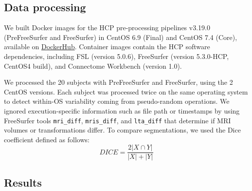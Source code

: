 \documentclass[a4paper,num-refs]{oup-contemporary}
\begin{document}

\subsection{Data processing}

We built Docker images for the HCP pre-processing pipelines v3.19.0
(PreFreeSurfer and FreeSurfer) in CentOS 6.9 (Final) and CentOS 7.4 (Core), available on
\href{https://hub.docker.com/r/bigdatalabteam/hcp-prefreesurfer/}{DockerHub}.
Container images contain the HCP software dependencies, including FSL
(version 5.0.6), FreeSurfer (version 5.3.0-HCP, CentOS4 build), and
Connectome Workbench (version 1.0).

We processed the 20 subjects with PreFreeSurfer and FreeSurfer, using the 2
CentOS versions. Each subject was processed twice on the same operating
system to detect within-OS variability coming from pseudo-random
operations. We ignored execution-specific information such as file path or
timestamps by using FreeSurfer tools \texttt{mri\_diff},
\texttt{mris\_diff}, and \texttt{lta\_diff} that determine if MRI volumes
or transformations differ. To compare segmentations, we used the Dice coefficient defined as follows:
\[DICE=\frac{2|X \cap Y|}{|X| + |Y|}\]



\subsection{Results}

\end{document}
